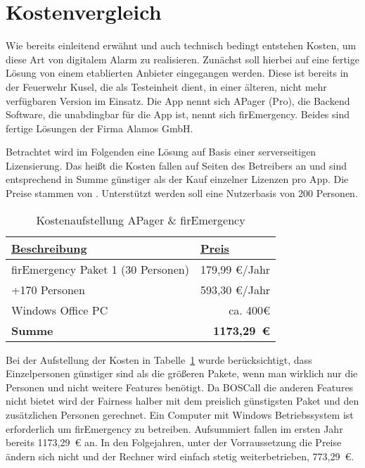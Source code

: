 \section{Kostenvergleich}
\label{sec:kostenvergleich}
Wie bereits einleitend erwähnt und auch technisch bedingt entstehen Kosten, um diese Art von digitalem Alarm zu realisieren. Zunächst soll hierbei auf eine fertige Lösung von einem etablierten Anbieter eingegangen werden. Diese ist bereits in der Feuerwehr Kusel, die als Testeinheit dient, in einer älteren, nicht mehr verfügbaren Version im Einsatz. Die App nennt sich APager (Pro), die Backend Software, die unabdingbar für die App ist, nennt sich firEmergency. Beides sind fertige Lösungen der Firma Alamos GmbH.

Betrachtet wird im Folgenden eine Lösung auf Basis einer serverseitigen Lizensierung. Das heißt die Kosten fallen auf Seiten des Betreibers an und sind entsprechend in Summe günstiger als der Kauf einzelner Lizenzen pro App. Die Preise stammen von \cite{Alamos:FE2Pricing}. Unterstützt werden soll eine Nutzerbasis von 200 Personen.
\begin{table}[]
	\centering
	\caption{Kostenaufstellung APager \& firEmergency}
	\label{tbl:FE2Pricing}
	\begin{tabular}{|l|r|}
		\hline
		{\ul \textbf{Beschreibung}}        & \multicolumn{1}{l|}{{\ul \textbf{Preis}}} \\ \hline
		firEmergency Paket 1 (30 Personen) & 179,99 €/Jahr                             \\ \hline
		+170 Personen                      & 593,30 €/Jahr                             \\ \hline
		Windows Office PC                  & ca. 400€                                  \\ \hline\hline
		\textbf{Summe}                  & \textbf{1173,29~€}                                  \\ \hline
	\end{tabular}
\end{table}

Bei der Aufstellung der Kosten in Tabelle~\ref{tbl:FE2Pricing} wurde berücksichtigt, dass Einzelpersonen günstiger sind als die größeren Pakete, wenn man wirklich nur die Personen und nicht weitere Features benötigt. Da BOSCall die anderen Features nicht bietet wird der Fairness halber mit dem preislich günstigsten Paket und den zusätzlichen Personen gerechnet. Ein Computer mit Windows Betriebssystem ist erforderlich um firEmergency zu betreiben.\cite{Alamos:FE2SystemRequirements} Aufsummiert fallen im ersten Jahr bereits 1173,29~€ an. In den Folgejahren, unter der Vorraussetzung die Preise ändern sich nicht und der Rechner wird einfach stetig weiterbetrieben, 773,29~€.

